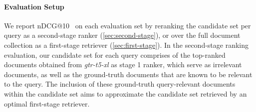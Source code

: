 \documentclass{article}
\begin{document}
\paragraph{Evaluation Setup} We report nDCG@10~\citep[Normalised
Cumulative Discount Gain;][]{jarvelin2000ir} on each evaluation set by reranking the candidate set per query as a second-stage ranker (\autoref{sec:second-stage}), or over the full document collection as a first-stage retriever (\autoref{sec:first-stage}). In the second-stage ranking evaluation, our candidate set for each query comprises of the top-ranked documents obtained from \textit{gtr-t5-xl} as stage 1 ranker, which serve as irrelevant documents, as well as the ground-truth documents that are known to be relevant to the query. The inclusion of these ground-truth query-relevant documents within the candidate set aims to approximate the candidate set retrieved by an optimal first-stage retriever.
\end{document}
